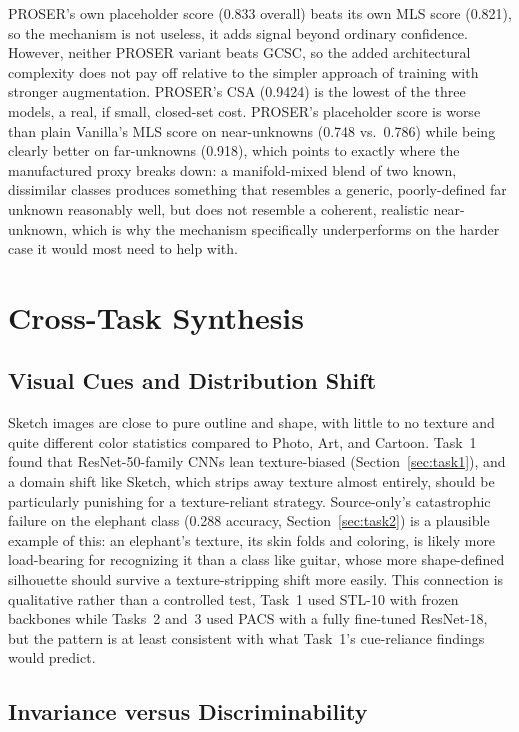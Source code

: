 \documentclass{article}
\begin{document}
PROSER's own placeholder score (0.833 overall) beats its own MLS score (0.821), so the mechanism is not useless, it adds signal beyond ordinary confidence. However, neither PROSER variant beats GCSC, so the added architectural complexity does not pay off relative to the simpler approach of training with stronger augmentation. PROSER's CSA (0.9424) is the lowest of the three models, a real, if small, closed-set cost. PROSER's placeholder score is worse than plain Vanilla's MLS score on near-unknowns (0.748 vs.\ 0.786) while being clearly better on far-unknowns (0.918), which points to exactly where the manufactured proxy breaks down: a manifold-mixed blend of two known, dissimilar classes produces something that resembles a generic, poorly-defined far unknown reasonably well, but does not resemble a coherent, realistic near-unknown, which is why the mechanism specifically underperforms on the harder case it would most need to help with.

\section{Cross-Task Synthesis}
\label{sec:synthesis}

\subsection{Visual Cues and Distribution Shift}

Sketch images are close to pure outline and shape, with little to no texture and quite different color statistics compared to Photo, Art, and Cartoon. Task~1 found that ResNet-50-family CNNs lean texture-biased (Section~\ref{sec:task1}), and a domain shift like Sketch, which strips away texture almost entirely, should be particularly punishing for a texture-reliant strategy. Source-only's catastrophic failure on the elephant class (0.288 accuracy, Section~\ref{sec:task2}) is a plausible example of this: an elephant's texture, its skin folds and coloring, is likely more load-bearing for recognizing it than a class like guitar, whose more shape-defined silhouette should survive a texture-stripping shift more easily. This connection is qualitative rather than a controlled test, Task~1 used STL-10 with frozen backbones while Tasks~2 and~3 used PACS with a fully fine-tuned ResNet-18, but the pattern is at least consistent with what Task~1's cue-reliance findings would predict.

\subsection{Invariance versus Discriminability}
\end{document}
